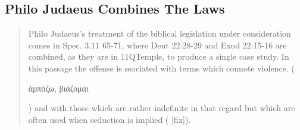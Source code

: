 \documentclass[11pt]{article}
\begin{document}
\subsection{Philo Judaeus Combines The Laws}

\begin{quote}
Philo Judaeus's treatment of the biblical legislation under consideration comes in Spec. 3.11 65-71, where Deut 22:28-29 and Exod 22:15-16 are combined, as they are in 11QTemple, to produce a single case study. In this passage the offense is ssociated with terms which connote violence. (\begin{greek}ἁρπάζω, βιάζομαι\end{greek}) and with those which are rather indefinite in that regard but which are often used when seduction is implied ( [fix]).
\end{quote}
\end{document}
